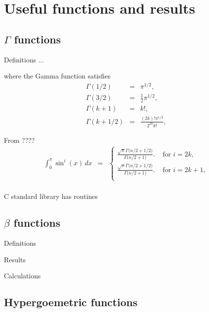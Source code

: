 \section{Useful functions and results}
\label{sec:useful}




\subsection{$\Gamma$ functions}

Definitions ...


where the Gamma function satisfies\cite[6.1.12]{Abramowitz_and_Stegun}
\begin{eqnarray}
 \label{eq:gamma}
 \Gamma(1/2) & = & \pi^{1/2}, \\
 \Gamma(3/2) & = & \frac{1}{2} \pi^{1/2}, \\
 \Gamma(k+1) & = & k!, \\
 \Gamma(k+1/2) & = & \frac{(2k)! \pi^{1/2}}{2^{2k} k!},
\end{eqnarray}



From ????
\begin{eqnarray}
  \int_0^{\pi} \sin^i(x) \, dx
    & = & \left\{ \begin{array}{ll}
        \displaystyle
      \frac{\sqrt{\pi} \Gamma\big( n/2 + 1/2 \big)}{\Gamma\big( n/2+1 \big)}.
      & \mbox{ for } i = 2k, \\
        \displaystyle
      \frac{\sqrt{\pi} \Gamma\big( n/2 + 1/2 \big)}{\Gamma\big( n/2+1 \big)}.
      & \mbox{ for } i = 2k+1, \\
           \end{array} \right. \nonumber \\
\end{eqnarray}



C standard library has routines

\subsection{$\beta$ functions}

Definitions

Results

Calculations

\subsection{Hypergoemetric functions}


